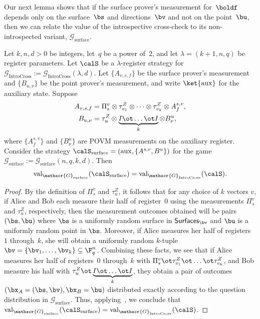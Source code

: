\documentclass[11pt]{article}
\newcommand{\oktimes}[2]{\underbrace{#1 \ot \dots \ot #1}_{#2}}
\newcommand{\register}{\lambda}
\newcommand{\game}{\mathscr{G}}
\newcommand{\valstrat}[2]{\mathrm{val}_{#1}(#2)}
\newcommand{\surfaces}[1]{\mathsf{Surfaces}_{#1}}
\begin{document}
Our next lemma shows that if the surface prover's measurement for~$\boldf$ depends only on the surface~$\bs$ and directions~$\bv$
and not on the point~$\bu$, then we can relate the value of the introspective
cross-check to its non-introspected variant, $\game_{\mathrm{surface}}$.
\begin{lemma}\label{lem:big-cross-check}
Let $k, n, d>0$ be integers, let~$q$ be a power of~$2$,
and let $\lambda = (k+1, n, q)$ be register parameters.
Let $\calS$ be a $\register$-register strategy for $\game_{\mathrm{IntroCross}} := \game_{\mathrm{IntroCross}}(\lambda, d)$.
Let $\{A_{v, s, f}\}$ be the surface prover's measurement
and $\{B_{u, \nu}\}$ be the point prover's measurement,
and write $\ket{\mathrm{aux}}$ for the auxiliary state.
Suppose
\begin{align*}
A_{ v,s, f} &= \Pi^{v}_s \otimes \tau_{v_1}^Z \otimes \dots \otimes
\tau_{v_k}^Z \otimes A^{s,v}_f,\\
B_{u, \nu} &= \tau_u^Z \otimes \oktimes{I}{k} \otimes B^u_\nu,
\end{align*}
where $\{A^{s, v}_f\}$ and $\{B^u_\nu\}$ are POVM measurements on the auxiliary register.
Consider the strategy $\calS_{\mathrm{surface}} = (\mathrm{aux}, \{A^{s, v}, B^u\})$ for the game $\game_{\mathrm{surface}}  := \game_{\mathrm{surface}}(n, q, k, d)$.
Then
\begin{equation*}
\valstrat{\game_{\mathrm{surface}}}{\calS_{\mathrm{surface}}}
= \valstrat{\game_{\mathrm{IntroCross}}}{\calS}.
\end{equation*}
\end{lemma}
\begin{proof}
  By the definition of $\Pi^{v}_s$ and $\tau^Z_u$, it follows that for
  any choice of $k$ vectors $v$, if
  Alice and Bob each measure their half of register~$0$
  using the measurements $\Pi^v_s$ and $\tau^Z_u$, respectively, then
  the measurement outcomes obtained will be pairs $(\bs, \bu)$ where $\bs$
  is a uniformly random surface in $\surfaces{\bv}$ and $\bu$ is a uniformly
  random point in $\bs$. Moreover, if Alice measures her half of registers~$1$ through~$k$,
  she will obtain a uniformly random $k$-tuple $\bv = \{\bv_1,
  \dots, \bv_k\} \subseteq \F_q^n$. Combining these facts, we see that
  if Alice measures her half of registers~$0$ through~$k$ with
  $\Pi^v_s \ot \tau^Z_{v_1} \ot \dots \ot \tau^Z_{v_k}$, and Bob
  measure his half with $\tau^Z_u \ot \oktimes{I}{k}$, they obtain a
  pair of outcomes $(\bx_A = (\bs, \bv), \bx_B = \bu)$ distributed exactly
  according to the question distribution in
  $\game_{\mathrm{surface}}$. Thus, applying~, we conclude
that $\valstrat{\game_{\mathrm{surface}}}{\calS_{\mathrm{surface}}} = \valstrat{\game_{\mathrm{IntroCross}}}{\calS}$.
\end{proof}
\end{document}
